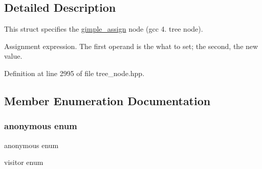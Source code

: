 \subsection{Detailed Description}
This struct specifies the \hyperlink{structgimple__assign}{gimple\+\_\+assign} node (gcc 4. tree node). 

Assignment expression. The first operand is the what to set; the second, the new value. 

Definition at line 2995 of file tree\+\_\+node.\+hpp.



\subsection{Member Enumeration Documentation}
\mbox{\label{structgimple__assign_ad1b5811db57f1826949de9f47bcccab9}} 
\subsubsection{\texorpdfstring{anonymous enum}{anonymous enum}}
{\footnotesize\ttfamily anonymous enum}



visitor enum 

